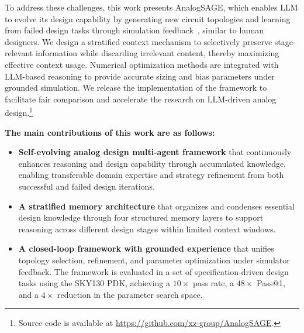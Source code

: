 To address these challenges, this work presents AnalogSAGE, which enables LLM to evolve its design capability by generating new circuit topologies and learning from failed design tasks through simulation feedback~\cite{yang2025zerosim}, similar to human designers.
We design a stratified context mechanism to selectively preserve stage-relevant information while discarding irrelevant content, thereby maximizing effective context usage.
Numerical optimization methods are integrated with LLM-based reasoning to provide accurate sizing and bias parameters under grounded simulation. We release the implementation of the framework to facilitate fair comparison and accelerate the research on LLM-driven analog design.\footnote{Source code is available at \url{https://github.com/xz-group/AnalogSAGE}.}


\textbf{The main contributions of this work are as follows:}
\begin{itemize}
	\item \textbf{Self-evolving analog design multi-agent framework} that continuously enhances reasoning and design capability through accumulated knowledge, enabling transferable domain expertise and strategy refinement from both successful and failed design iterations.
	\item \textbf{A stratified memory architecture} that organizes and condenses essential design knowledge through four structured memory layers to support reasoning across different design stages within limited context windows.
	\item \textbf{A closed-loop framework with grounded experience} that unifies topology selection, refinement, and parameter optimization under simulator feedback. The framework is evaluated in a set of specification-driven design tasks using the SKY130 PDK, achieving a $10\times$ pass rate, a $48\times$ Pass@1, and a $4\times$ reduction in the parameter search space.
\end{itemize}

